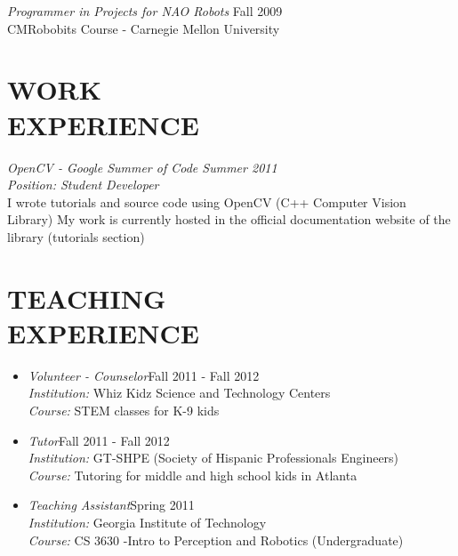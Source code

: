 \documentclass[margin]{res}
\begin{document}
\begin{resume}
                {\sl Programmer in Projects for NAO Robots} \hfill        Fall 2009 \\
                CMRobobits Course - Carnegie Mellon University

\section{WORK\\ EXPERIENCE}
               {\sl OpenCV - Google Summer of Code \hfill  Summer 2011\\
                \textit{Position:} Student Developer }\\
				I wrote tutorials and source code using OpenCV (C++ Computer Vision Library)
				My work is currently hosted in the official documentation website of the library (tutorials section)

\section{TEACHING\\ EXPERIENCE}

                \begin{itemize}  \itemsep -2pt %
                \item{\sl Volunteer - Counselor}\hfill  Fall 2011 - Fall 2012\\
                \textit{Institution:} Whiz Kidz Science and Technology Centers \\
                \textit{Course:} STEM classes for K-9 kids 
                
                \item{\sl Tutor}\hfill  Fall 2011 - Fall 2012\\
                \textit{Institution:} GT-SHPE (Society of Hispanic Professionals Engineers) \\
                \textit{Course:} Tutoring for middle and high school kids in Atlanta 
                
                \item{\sl Teaching Assistant}\hfill  Spring 2011\\
                \textit{Institution:} Georgia Institute of Technology \\
                \textit{Course:} CS 3630 -Intro to Perception and Robotics (Undergraduate) 
                                 
                 \end{itemize}


\end{resume}
\end{document}
